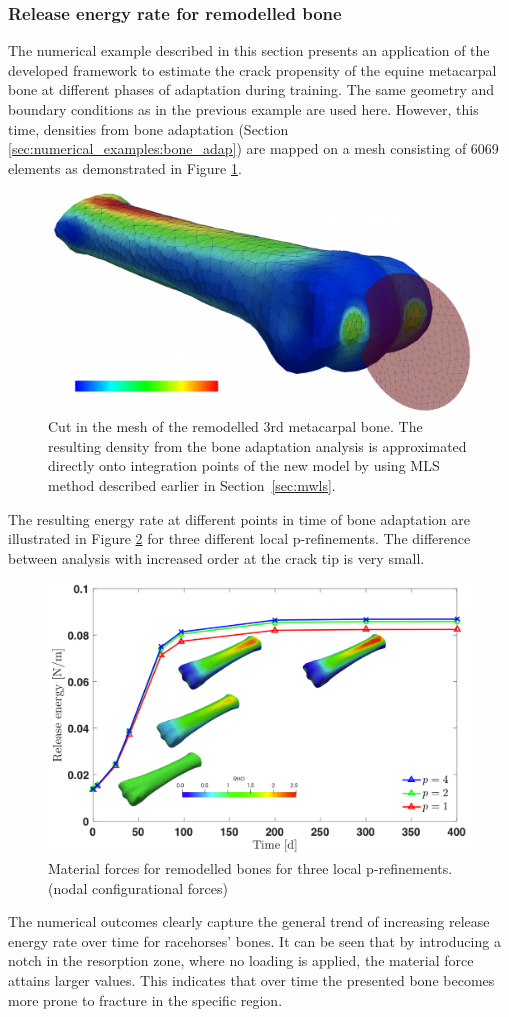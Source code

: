 \documentclass[11pt]{ACMEarticle}
\numberwithin{equation}{section}
\begin{document}
\subsubsection{Release energy rate for remodelled bone}
The numerical example described in this section presents an application of the developed framework to estimate the crack propensity of the equine metacarpal bone at different phases of adaptation during training. The same geometry and boundary conditions as in the previous example are used here. However, this time, densities from bone adaptation (Section \ref{sec:numerical_examples:bone_adap}) are mapped on a mesh consisting of 6069 elements as demonstrated in Figure \ref{fig:frackmeshcutting}. 
\begin{figure}
	\centering
	\includegraphics[width=0.4\linewidth]{Figures/frack_mesh_cutting}
	\caption{Cut in the mesh of the remodelled 3rd metacarpal bone. The resulting density from the bone adaptation analysis is approximated directly onto integration points of the new model by using MLS method described earlier in Section~\ref{sec:mwls}. }
	\label{fig:frackmeshcutting}
\end{figure}
The resulting energy rate at different points in time of bone adaptation are illustrated in Figure \ref{fig:crackmc3release} for three different local p-refinements. The difference between analysis with increased order at the crack tip is very small. 
\begin{figure}
	\centering
	\includegraphics[width=1\linewidth]{Figures/graphs/crack_mc3_release}
	\caption{Material forces for remodelled bones for three local p-refinements. (nodal configurational forces)}
	\label{fig:crackmc3release}
\end{figure}
The numerical outcomes clearly capture the general trend of increasing release energy rate over time for racehorses' bones. It can be seen that by introducing a notch in the resorption zone, where no loading is applied, the material force attains larger values. This indicates that over time the presented bone becomes more prone to fracture in the specific region. 
\end{document}
